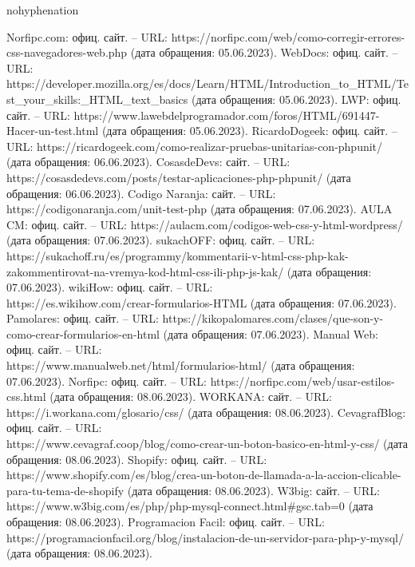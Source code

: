 \begin{hyphenrules}{nohyphenation}
\begin{thebibliography}{9}
     Norfipc.com: офиц. сайт. – URL: https://norfipc.com/web/como-corregir-errores-css-navegadores-web.php (дата обращения: 05.06.2023).
     WebDocs: офиц. сайт. – URL: https://developer.mozilla.org/es/docs/Learn/HTML/Introduction\_to\_HTML/Test\_your\_skills:\_HTML\_text\_basics (дата обращения: 05.06.2023).
     LWP: офиц. сайт. – URL: https://www.lawebdelprogramador.com/foros/HTML/691447-Hacer-un-test.html (дата обращения: 05.06.2023).
     RicardoDogeek: офиц. сайт. – URL: https://ricardogeek.com/como-realizar-pruebas-unitarias-con-phpunit/ (дата обращения: 06.06.2023).
     CosasdeDevs: сайт. – URL: https://cosasdedevs.com/posts/testar-aplicaciones-php-phpunit/ (дата обращения: 06.06.2023).
     Codigo Naranja: сайт. – URL: https://codigonaranja.com/unit-test-php (дата обращения: 07.06.2023).
     AULA CM: офиц. сайт. – URL: https://aulacm.com/codigos-web-css-y-html-wordpress/ (дата обращения: 07.06.2023).
     sukachOFF: офиц. сайт. – URL: https://sukachoff.ru/es/programmy/kommentarii-v-html-css-php-kak-zakommentirovat-na-vremya-kod-html-css-ili-php-js-kak/ (дата обращения: 07.06.2023).
     wikiHow: офиц. сайт. – URL: \\https://es.wikihow.com/crear-formularios-HTML (дата обращения: 07.06.2023).
     Pamolares: офиц. сайт. – URL: https://kikopalomares.com/clases/que-son-y-como-crear-formularios-en-html (дата обращения: 07.06.2023).
     Manual Web: офиц. сайт. – URL: \\https://www.manualweb.net/html/formularios-html/ (дата обращения: 07.06.2023).
     Norfipc: офиц. сайт. – URL: https://norfipc.com/web/usar-estilos-css.html (дата обращения: 08.06.2023).
     WORKANA: сайт. – URL: https://i.workana.com/glosario/css/ (дата обращения: 08.06.2023).
     CevagrafBlog: офиц. сайт. – URL: \\https://www.cevagraf.coop/blog/como-crear-un-boton-basico-en-html-y-css/ (дата обращения: 08.06.2023).
     Shopify: офиц. сайт. – URL: https://www.shopify.com/es/blog/crea-un-boton-de-llamada-a-la-accion-clicable-para-tu-tema-de-shopify (дата обращения: 08.06.2023).
     W3big: сайт. – URL: https://www.w3big.com/es/php/php-mysql-connect.html\#gsc.tab=0 (дата обращения: 08.06.2023).
     Programacion Facil: офиц. сайт. – URL: \\https://programacionfacil.org/blog/instalacion-de-un-servidor-para-php-y-mysql/ (дата обращения: 08.06.2023).
  \end{thebibliography}
\end{hyphenrules}
